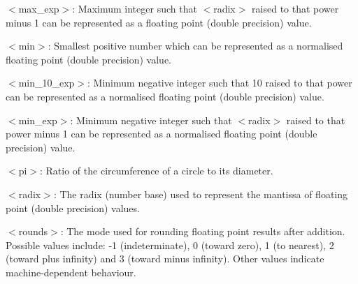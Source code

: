 \documentclass[twoside,11pt]{article}
\begin{document}
{{         \sstitem
         $<$max\_exp$>$: Maximum integer such that $<$radix$>$ raised to that
         power minus 1 can be represented as a floating point (double precision)
         value.

         \sstitem
         $<$min$>$: Smallest positive number which can be represented as a
         normalised floating point (double precision) value.

         \sstitem
         $<$min\_10\_exp$>$: Minimum negative integer such that 10 raised to that
         power can be represented as a normalised floating point (double
         precision) value.

         \sstitem
         $<$min\_exp$>$: Minimum negative integer such that $<$radix$>$ raised to
         that power minus 1 can be represented as a normalised floating point
         (double precision) value.

         \sstitem
         $<$pi$>$: Ratio of the circumference of a circle to its diameter.

         \sstitem
         $<$radix$>$: The radix (number base) used to represent the mantissa of
         floating point (double precision) values.

         \sstitem
         $<$rounds$>$: The mode used for rounding floating point results after
         addition. Possible values include: -1 (indeterminate), 0 (toward
         zero), 1 (to nearest), 2 (toward plus infinity) and 3 (toward minus
         infinity). Other values indicate machine-dependent behaviour.
      }
   }
\end{document}
